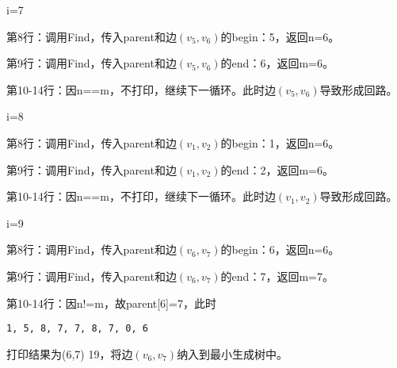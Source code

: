 \begin{frame}\ft{\subsubsecname}
\begin{figure}

\end{figure}
\end{frame}


\begin{frame}[fragile]\ft{\subsubsecname}
\tf i=7 
\vspace{0.05in}

第8行：调用Find，传入parent和边$(v_5,v_6)$的begin：5，返回n=6。 \vspace{0.05in}

第9行：调用Find，传入parent和边$(v_5,v_6)$的end：6，返回m=6。 \vspace{0.05in}

第10-14行：因n==m，不打印，继续下一循环。此时边$(v_5,v_6)$导致形成回路。
\end{frame}


\begin{frame}[fragile]\ft{\subsubsecname}
\tf i=8 
\vspace{0.05in}

第8行：调用Find，传入parent和边$(v_1,v_2)$的begin：1，返回n=6。 \vspace{0.05in}

第9行：调用Find，传入parent和边$(v_1,v_2)$的end：2，返回m=6。 \vspace{0.05in}

第10-14行：因n==m，不打印，继续下一循环。此时边$(v_1,v_2)$导致形成回路。
\end{frame}


\begin{frame}[fragile]\ft{\subsubsecname}
\tf i=9 
\vspace{0.05in}

第8行：调用Find，传入parent和边$(v_6,v_7)$的begin：6，返回n=6。 \vspace{0.05in}

第9行：调用Find，传入parent和边$(v_6,v_7)$的end：7，返回m=7。 \vspace{0.05in}

第10-14行：因n!=m，故parent[6]=7，此时
\begin{lstlisting}[xleftmargin=2em]
1, 5, 8, 7, 7, 8, 7, 0, 6
\end{lstlisting}
打印结果为(6,7) 19，将边$(v_6,v_7)$纳入到最小生成树中。

\end{frame}



